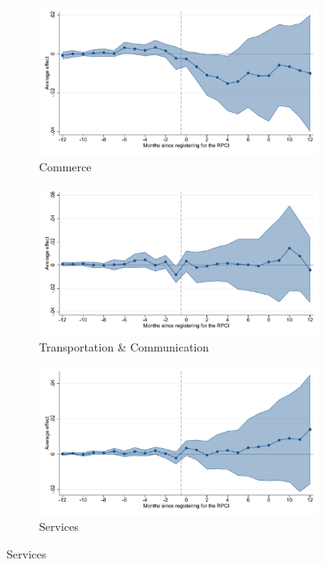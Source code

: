 \begin{figure}[H]
    \begin{subfigure}{0.32\textwidth}
    \caption{Commerce}
    \includegraphics[width=\textwidth]{04_Figures/muestra_10porciento/event_study_alta_ind_commerce_dcdh_connected.pdf}
    \end{subfigure}
    \begin{subfigure}{0.32\textwidth}
    \caption{Transportation \& Communication}
    \includegraphics[width=\textwidth]{04_Figures/muestra_10porciento/event_study_alta_ind_transport_dcdh_connected.pdf}
    \end{subfigure}
    \begin{subfigure}{0.32\textwidth}
    \caption{Services}
    \includegraphics[width=\textwidth]{04_Figures/muestra_10porciento/event_study_alta_ind_services_dcdh_connected.pdf}
    \end{subfigure}


\end{figure}
